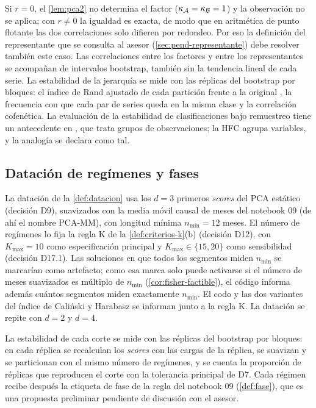 Si $r=0$, el \cref{lem:pca2} no determina el factor ($\kappa_{\mathcal{A}}=\kappa_{\mathcal{B}}=1$) y la
observación no se aplica; con $r\ne0$ la igualdad es exacta, de modo que en aritmética de punto
flotante las dos correlaciones solo difieren por redondeo. Por eso la definición del representante
que se consulta al asesor (\cref{sec:pend-representante}) debe resolver también este caso. Las
correlaciones entre los factores y entre los representantes se acompañan de intervalos bootstrap,
también sin la tendencia lineal de cada serie. La estabilidad de la jerarquía se mide con las
réplicas del bootstrap por bloques: el índice de Rand ajustado de cada partición frente a la
original \parencite{hubert_arabie_1985}, la frecuencia
con que cada par de series queda en la misma clase y la correlación cofenética. La evaluación de
la estabilidad de clasificaciones bajo remuestreo tiene un antecedente en
\textcite{hennig_2007}, que trata
grupos de observaciones; la HFC agrupa variables, y la analogía se declara como tal.

\subsection{Datación de regímenes y fases}
\label{sec:met-datacion}

La datación de la \cref{def:datacion} usa los $d=3$ primeros \emph{scores} del PCA estático
(decisión D9), suavizados con la media móvil causal de \ventanaMediaMovil{} meses del notebook 09 (de ahí el nombre
PCA-MM\ventanaMediaMovil), con longitud mínima $n_{\min}=12$ meses. El número de regímenes lo fija la regla K de la
\cref{def:criterios-k}(b) (decisión D12), con $K_{\max}=10$ como especificación principal y
$K_{\max}\in\{15, 20\}$ como sensibilidad (decisión D17.1). Las soluciones en que todos los
segmentos miden $n_{\min}$ se marcarían como artefacto; como esa marca solo puede activarse si el
número de meses suavizados es múltiplo de $n_{\min}$ (\cref{cor:fisher-factible}), el código
informa además cuántos segmentos miden exactamente $n_{\min}$. El codo y las dos variantes del
índice de Caliński y Harabasz se informan junto a la regla K. La datación se repite con $d=2$ y
$d=4$.

La estabilidad de cada corte se mide con las réplicas del bootstrap por bloques: en cada réplica se
recalculan los \emph{scores} con las cargas de la réplica, se suavizan y se particionan con el mismo
número de regímenes, y se cuenta la proporción de réplicas que reproducen el corte con la tolerancia
principal de D7. Cada régimen recibe después la etiqueta de fase de la regla del notebook 09
(\cref{def:fase}), que es una propuesta preliminar pendiente de discusión con el asesor.

